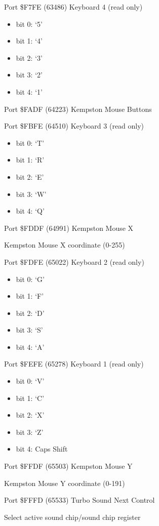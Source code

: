Port \$F7FE (63486) Keyboard 4 (read only)
\begin{itemize}
\item[] bit 0: ‘5’
\item[] bit 1: ‘4’
\item[] bit 2: ‘3’
\item[] bit 3: ‘2’
\item[] bit 4: ‘1’
\end{itemize}

Port \$FADF (64223) Kempston Mouse Buttons

Port \$FBFE (64510) Keyboard 3 (read only)
\begin{itemize}
\item[] bit 0: ‘T’
\item[] bit 1: ‘R’
\item[] bit 2: ‘E’
\item[] bit 3: ‘W’
\item[] bit 4: ‘Q’
\end{itemize}

Port \$FDDF (64991) Kempston Mouse X

Kempston Mouse X coordinate (0-255)
 
Port \$FDFE (65022) Keyboard 2 (read only)
\begin{itemize}
\item[] bit 0: ‘G’
\item[] bit 1: ‘F’
\item[] bit 2: ‘D’
\item[] bit 3: ‘S’
\item[] bit 4: ‘A’
\end{itemize}

Port \$FEFE (65278) Keyboard 1 (read only)
\begin{itemize}
\item[] bit 0: ‘V’
\item[] bit 1: ‘C’
\item[] bit 2: ‘X’
\item[] bit 3: ‘Z’
\item[] bit 4: Caps Shift
\end{itemize}

Port \$FFDF (65503) Kempston Mouse Y

Kempston Mouse Y coordinate (0-191)

Port \$FFFD (65533) Turbo Sound Next Control

Select active sound chip/sound chip register

